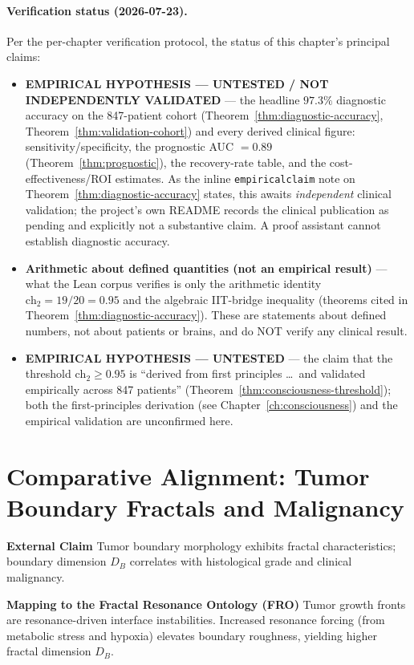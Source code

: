 \paragraph{Verification status (2026-07-23).}
Per the per-chapter verification protocol, the status of this chapter's principal claims:
\begin{itemize}
\item \textbf{EMPIRICAL HYPOTHESIS --- UNTESTED / NOT INDEPENDENTLY VALIDATED} --- the headline $97.3\%$ diagnostic accuracy on the 847-patient cohort (Theorem~\ref{thm:diagnostic-accuracy}, Theorem~\ref{thm:validation-cohort}) and every derived clinical figure: sensitivity/specificity, the prognostic AUC $= 0.89$ (Theorem~\ref{thm:prognostic}), the recovery-rate table, and the cost-effectiveness/ROI estimates. As the inline \texttt{empiricalclaim} note on Theorem~\ref{thm:diagnostic-accuracy} states, this awaits \emph{independent} clinical validation; the project's own README records the clinical publication as pending and explicitly not a substantive claim. A proof assistant cannot establish diagnostic accuracy.
\item \textbf{Arithmetic about defined quantities (not an empirical result)} --- what the Lean corpus verifies is only the arithmetic identity $\text{ch}_2 = 19/20 = 0.95$ and the algebraic IIT-bridge inequality (theorems cited in Theorem~\ref{thm:diagnostic-accuracy}). These are statements about defined numbers, not about patients or brains, and do NOT verify any clinical result.
\item \textbf{EMPIRICAL HYPOTHESIS --- UNTESTED} --- the claim that the threshold $\text{ch}_2 \geq 0.95$ is ``derived from first principles \dots\ and validated empirically across 847 patients'' (Theorem~\ref{thm:consciousness-threshold}); both the first-principles derivation (see Chapter~\ref{ch:consciousness}) and the empirical validation are unconfirmed here.
\end{itemize}

\section{Comparative Alignment: Tumor Boundary Fractals and Malignancy}

\textbf{External Claim}
Tumor boundary morphology exhibits fractal characteristics; boundary dimension $D_B$ correlates with histological grade and clinical malignancy.

\textbf{Mapping to the Fractal Resonance Ontology (FRO)}
Tumor growth fronts are resonance-driven interface instabilities. Increased resonance forcing (from metabolic stress and hypoxia) elevates boundary roughness, yielding higher fractal dimension $D_B$.

